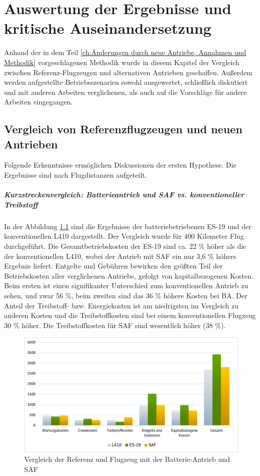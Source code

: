 \chapter{Auswertung der Ergebnisse und kritische Auseinandersetzung}
\label{ch:Auswertung der Ergebnisse}
Anhand der in dem Teil \ref{ch:Änderungen durch neue Antriebe, Annahmen und Methodik} 
vorgeschlagenen Methodik wurde in diesem Kapitel der Vergleich zwischen 
Referenz-Flugzeugen und alternativen Antrieben geschaffen.
Außerdem werden aufgestellte Betriebsszenarien sowohl ausgewertet, 
schließlich diskutiert und mit anderen Arbeiten verglichenen, 
als auch auf die Vorschläge für andere Arbeiten eingegangen.

\section{Vergleich von Referenzflugzeugen und neuen Antrieben}
\label{s:Ergebnisse_Flugzeuge}
Folgende Erkenntnisse ermöglichen Diskussionen der ersten Hypothese. 
Die Ergebnisse sind nach Flugdistanzen aufgeteilt.\\
%
\paragraph{Kurzstreckenvergleich: Batterieantrieb und SAF vs. konventioneller Treibstoff}
%
In der Abbildung \ref{vergleichBA_Ref} sind die Ergebnisse der 
batteriebetriebenen ES-19 und der konventionellen L410 dargestellt.
Der Vergleich wurde für 400 Kilometer Flug durchgeführt.
%
Die Gesamtbetriebskosten der ES-19 sind ca. 22 \% höher als die der konventionellen L410, 
wobei der Antrieb mit SAF ein nur 3,6 \% höhers Ergebnis liefert. 
Entgelte und Gebühren bewirken den größten Teil der Betriebskosten aller verglichenen Antriebe, 
gefolgt von kapitalbezogenen Kosten. 
Beim ersten ist einen signifikanter Unterschied zum konventionellen Antrieb zu sehen, 
und zwar 56 \%, beim zweiten sind das 36 \% höhere Kosten bei BA. 
Der Anteil der Treibstoff- bzw. Energiekosten ist am niedrigsten im Vergleich zu anderen Kosten 
und die Treibstoffkosten sind bei einem konventionellen Flugzeug 30 \% höher. 
Die Treibstoffkosten für SAF sind wesentlich höher (38 \%).

\begin{figure}[h]
	\centering
	\includegraphics[width=0.9\linewidth]{Bilder/VergleichBA_Ref.png}
	\caption[Betriebskosten]{Vergleich der Referenz und Flugzeug mit der Batterie-Antrieb und SAF}
	\label{vergleichBA_Ref}
\end{figure}

